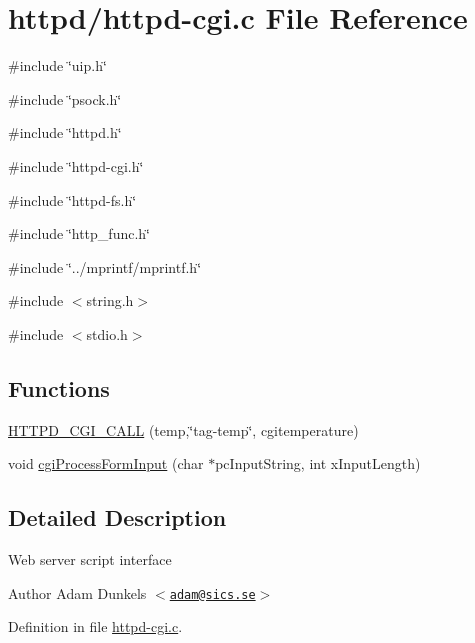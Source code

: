 \hypertarget{httpd-cgi_8c}{
\section{httpd/httpd-\/cgi.c File Reference}
\label{httpd-cgi_8c}
}
{\ttfamily \#include \char`\"{}uip.h\char`\"{}}\par
{\ttfamily \#include \char`\"{}psock.h\char`\"{}}\par
{\ttfamily \#include \char`\"{}httpd.h\char`\"{}}\par
{\ttfamily \#include \char`\"{}httpd-\/cgi.h\char`\"{}}\par
{\ttfamily \#include \char`\"{}httpd-\/fs.h\char`\"{}}\par
{\ttfamily \#include \char`\"{}http\_\-func.h\char`\"{}}\par
{\ttfamily \#include \char`\"{}../mprintf/mprintf.h\char`\"{}}\par
{\ttfamily \#include $<$string.h$>$}\par
{\ttfamily \#include $<$stdio.h$>$}\par
\subsection*{Functions}
\begin{DoxyCompactItemize}
\item 
\hyperlink{group__httpd_ga8eddae8a1ebb30e99fa532c24b9636e2}{HTTPD\_\-CGI\_\-CALL} (temp,\char`\"{}tag-\/temp\char`\"{}, cgitemperature)
\item 
void \hyperlink{group__httpd_ga4f9b39d727880fedab8fe2e4e2aafbf3}{cgiProcessFormInput} (char $\ast$pcInputString, int xInputLength)
\end{DoxyCompactItemize}


\subsection{Detailed Description}
Web server script interface \begin{DoxyAuthor}{Author}
Adam Dunkels $<$\href{mailto:adam@sics.se}{\tt adam@sics.se}$>$ 
\end{DoxyAuthor}


Definition in file \hyperlink{httpd-cgi_8c_source}{httpd-\/cgi.c}.

